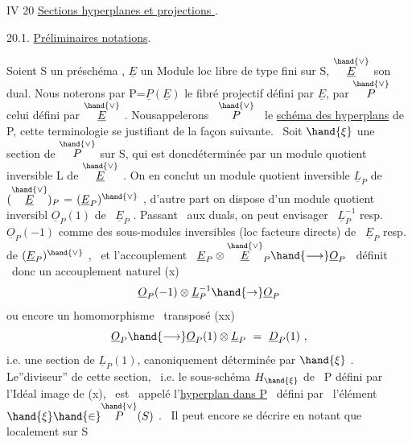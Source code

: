 IV 20 \quad \uline{Sections hyperplanes et projections }.

20.1. \quad \uline{Préliminaires  notations}.

Soient S un \quad préschéma , $\underline{E}$ un Module loc libre de type fini sur S,
$\overset{\hand{\vee}}{\underline{E}}$ son dual. Nous noterons par P=$\underline{P}(\underline{E})$ le fibré projectif défini par $\underline{E}$,
par $\overset{\hand{\vee}}{P}$ celui défini par $\overset{\hand{\vee}}{\underline{E}}$ . Nousappelerons \ $\overset{\hand{\vee}}{P}$ \ le \uline{schéma des hyperplans}
de P, cette terminologie se justifiant de la façon suivante. \ Soit
$\hand{\xi}$ une section de $\overset{\hand{\vee}}{P}$ sur S, qui est donc\hand{/}déterminée par un module quotient
inversible L de $\overset{\hand{\vee}}{\underline{E}}$ . On en conclut un module quotient inversible
$\underline{L}_P$ de$(\overset{\hand{\vee}}{\underline{E}})_P$ = $(\underline{E}_P)^{\hand{\vee}}$ , d'autre part on dispose d'un module quotient inversibl
$\underline{O}_P(1)$ de \ $\underline{E}_P$ . Passant \ aux duals, on peut envisager \ $\underline{L}_P^{-1}$ resp. $\underline{O}_P(-1)$
comme des sous-modules inversibles (loc facteurs directs) de \ $\underline{E}_P$ resp.
de $(\underline{E}_P)^{\hand{\vee}}$ , \ et l'accouplement \ $\underline{E}_P \otimes \overset{\hand{\vee}}{\underline{E}}_P \hand{\longrightarrow} \underline{O}_P$ \ définit \ donc un
accouplement naturel
(x) \[ \underline{O}_P(-1)\otimes\underline{L}_P^{-1} \hand{\to} \underline{O}_P \]
ou encore un homomorphisme \ transposé
\margin{$\|$}
(xx) \[ \underline{O}_P \hand{\longrightarrow} \underline{O}_P(1)\otimes\underline{L}_P \ = \ \underline{D}_P(1) \ , \]
i.e. une section de $\underline{L}_P(1)$, canoniquement déterminée par $\hand{\xi}$ . Le''diviseur''
de cette section, \ i.e. le sous-schéma $H_{\hand{\xi}}$ de \ P défini par l'Idéal
image de (x), \ est \ appelé l'\uline{hyperplan dans P} \ défini par \ l'élément
$\hand{\xi} \hand{\in} \overset{\hand{\vee}}{P}(S)$ . \ Il peut encore se décrire en notant que localement sur S 
